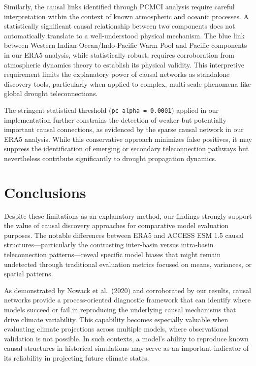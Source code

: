 \documentclass[
]{krantz}
\begin{document}
Similarly, the causal links identified through PCMCI analysis require careful interpretation within the context of known atmospheric and oceanic processes. A statistically significant causal relationship between two components does not automatically translate to a well-understood physical mechanism. The blue link between Western Indian Ocean/Indo-Pacific Warm Pool and Pacific components in our ERA5 analysis, while statistically robust, requires corroboration from atmospheric dynamics theory to establish its physical validity. This interpretive requirement limits the explanatory power of causal networks as standalone discovery tools, particularly when applied to complex, multi-scale phenomena like global drought teleconnections.

The stringent statistical threshold (\texttt{pc\_alpha\ =\ 0.0001}) applied in our implementation further constrains the detection of weaker but potentially important causal connections, as evidenced by the sparse causal network in our ERA5 analysis. While this conservative approach minimizes false positives, it may suppress the identification of emerging or secondary teleconnection pathways but nevertheless contribute significantly to drought propagation dynamics.

\section{Conclusions}\label{conclusions}

Despite these limitations as an explanatory method, our findings strongly support the value of causal discovery approaches for comparative model evaluation purposes. The notable differences between ERA5 and ACCESS ESM 1.5 causal structures---particularly the contrasting inter-basin versus intra-basin teleconnection patterns---reveal specific model biases that might remain undetected through traditional evaluation metrics focused on means, variances, or spatial patterns.

As demonstrated by Nowack et al.~(2020) and corroborated by our results, causal networks provide a process-oriented diagnostic framework that can identify where models succeed or fail in reproducing the underlying causal mechanisms that drive climate variability. This capability becomes especially valuable when evaluating climate projections across multiple models, where observational validation is not possible. In such contexts, a model's ability to reproduce known causal structures in historical simulations may serve as an important indicator of its reliability in projecting future climate states.
\end{document}

